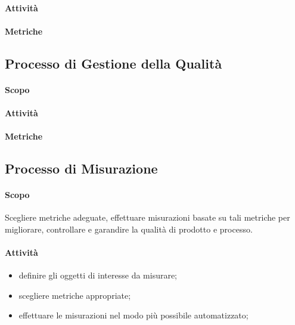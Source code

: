 		\paragraph{Attività}
		\paragraph{Metriche}
	\subsection{Processo di Gestione della Qualità}
		\paragraph{Scopo}
		\paragraph{Attività}
		\paragraph{Metriche}
	\subsection{Processo di Misurazione}
		\paragraph{Scopo}
		Scegliere metriche adeguate, effettuare misurazioni basate su tali metriche per migliorare, controllare e garandire la qualità di prodotto e processo.
		\paragraph{Attività}
		\begin{itemize}
			\item definire gli oggetti di interesse da misurare;
			\item scegliere metriche appropriate;
			\item effettuare le misurazioni nel modo più possibile automatizzato;
		\end{itemize}
		
